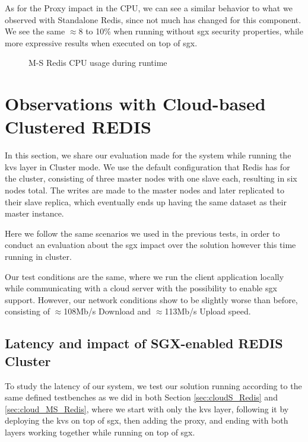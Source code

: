 As for the Proxy impact in the CPU, we can see a similar behavior to what we observed with Standalone Redis, since not much has changed for this component. We see the same $\approx$8 to 10\% when running without \gls{sgx} security properties, while more expressive results when executed on top of \gls{sgx}.

\begin{figure}[htbp]
	\centering
	\caption{M-S Redis CPU usage during runtime}
	\label{fig:cpuUsageMS}
\end{figure}

\section{Observations with Cloud-based Clustered REDIS}
In this section, we share our evaluation made for the system while running the \gls{kvs} layer in Cluster mode. We use the default configuration that Redis has for the cluster, consisting of three master nodes with one slave each, resulting in six nodes total. The writes are made to the master nodes and later replicated to their slave replica, which eventually ends up having the same dataset as their master instance. 

Here we follow the same scenarios we used in the previous tests, in order to conduct an evaluation about the \gls{sgx} impact over the solution however this time running in cluster.

Our test conditions are the same, where we run the client application locally while communicating with a cloud server with the possibility to enable \gls{sgx} support. However, our network conditions show to be slightly worse than before, consisting of $\approx$108Mb/s Download and $\approx$113Mb/s Upload speed.

\subsection{Latency and impact of SGX-enabled REDIS Cluster}

To study the latency of our system, we test our solution running according to the same defined testbenches as we did in both Section \ref{sec:cloudS_Redis} and \ref{sec:cloud_MS_Redis}, where we start with only the \gls{kvs} layer, following it by deploying the \gls{kvs} on top of \gls{sgx}, then adding the proxy, and ending with both layers working together while running on top of \gls{sgx}. 

